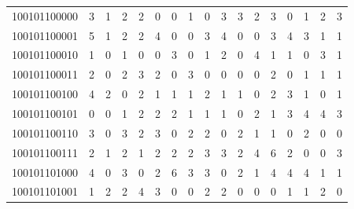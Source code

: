 \documentclass[10pt,a4paper]{article}
\begin{document}
\begin{longtable}{ |c|c|c|c|c|c|c|c|c|c|c|c|c|c|c|c|c| }
    100101100000              & 3                            & 1                                & 2                            & 2                              & 0   & 0   & 1   & 0   & 3   & 3   & 2   & 3   & 0   & 1   & 2   & 3   \\
    100101100001              & 5                            & 1                                & 2                            & 2                              & 4   & 0   & 0   & 3   & 4   & 0   & 0   & 3   & 4   & 3   & 1   & 1   \\
    100101100010              & 1                            & 0                                & 1                            & 0                              & 0   & 3   & 0   & 1   & 2   & 0   & 4   & 1   & 1   & 0   & 3   & 1   \\
    100101100011              & 2                            & 0                                & 2                            & 3                              & 2   & 0   & 3   & 0   & 0   & 0   & 0   & 2   & 0   & 1   & 1   & 1   \\
    100101100100              & 4                            & 2                                & 0                            & 2                              & 1   & 1   & 1   & 2   & 1   & 1   & 0   & 2   & 3   & 1   & 0   & 1   \\
    100101100101              & 0                            & 0                                & 1                            & 2                              & 2   & 2   & 1   & 1   & 1   & 0   & 2   & 1   & 3   & 4   & 4   & 3   \\
    100101100110              & 3                            & 0                                & 3                            & 2                              & 3   & 0   & 2   & 2   & 0   & 2   & 1   & 1   & 0   & 2   & 0   & 0   \\
    100101100111              & 2                            & 1                                & 2                            & 1                              & 2   & 2   & 2   & 3   & 3   & 2   & 4   & 6   & 2   & 0   & 0   & 3   \\
    100101101000              & 4                            & 0                                & 3                            & 0                              & 2   & 6   & 3   & 3   & 0   & 2   & 1   & 4   & 4   & 4   & 1   & 1   \\
    100101101001              & 1                            & 2                                & 2                            & 4                              & 3   & 0   & 0   & 2   & 2   & 0   & 0   & 0   & 1   & 1   & 2   & 0   \\

\end{longtable}
\end{document}

